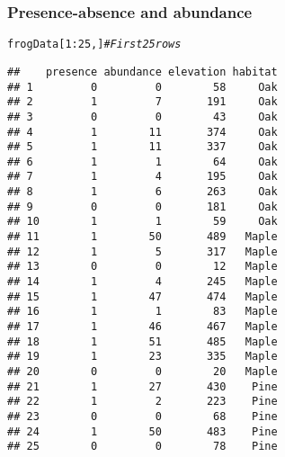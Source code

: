 \documentclass[color=usenames,dvipsnames]{beamer}\usepackage[]{graphicx}\usepackage[]{color}
\makeatletter
\newcommand{\hlnum}[1]{\textcolor[rgb]{0.69,0.494,0}{#1}}%
\newcommand{\hlcom}[1]{\textcolor[rgb]{0.514,0.506,0.514}{\textit{#1}}}%
\newcommand{\hlopt}[1]{\textcolor[rgb]{0,0,0}{#1}}%
\newcommand{\hlstd}[1]{\textcolor[rgb]{0,0,0}{#1}}%
\newenvironment{kframe}{%
 \def\at@end@of@kframe{}%
 \ifinner\ifhmode%
  \def\at@end@of@kframe{\end{minipage}}%
  \begin{minipage}{\columnwidth}%
 \fi\fi%
 \def\FrameCommand##1{\hskip\@totalleftmargin \hskip-\fboxsep
 \colorbox{shadecolor}{##1}\hskip-\fboxsep
     \hskip-\linewidth \hskip-\@totalleftmargin \hskip\columnwidth}%
 \MakeFramed {\advance\hsize-\width
   \@totalleftmargin\z@ \linewidth\hsize
   \@setminipage}}%
 {\par\unskip\endMakeFramed%
 \at@end@of@kframe}
\newenvironment{knitrout}{}{} %
\makeatother
\begin{document}
\begin{frame}[fragile]
  \frametitle{Presence-absence and abundance}

\begin{center}
\tiny
\begin{knitrout}\tiny
{}\color{fgcolor}\begin{kframe}
\begin{alltt}
\hlstd{frogData[}\hlnum{1}\hlopt{:}\hlnum{25}\hlstd{,]} \hlcom{# First 25 rows}
\end{alltt}
\begin{verbatim}
##    presence abundance elevation habitat
## 1         0         0        58     Oak
## 2         1         7       191     Oak
## 3         0         0        43     Oak
## 4         1        11       374     Oak
## 5         1        11       337     Oak
## 6         1         1        64     Oak
## 7         1         4       195     Oak
## 8         1         6       263     Oak
## 9         0         0       181     Oak
## 10        1         1        59     Oak
## 11        1        50       489   Maple
## 12        1         5       317   Maple
## 13        0         0        12   Maple
## 14        1         4       245   Maple
## 15        1        47       474   Maple
## 16        1         1        83   Maple
## 17        1        46       467   Maple
## 18        1        51       485   Maple
## 19        1        23       335   Maple
## 20        0         0        20   Maple
## 21        1        27       430    Pine
## 22        1         2       223    Pine
## 23        0         0        68    Pine
## 24        1        50       483    Pine
## 25        0         0        78    Pine
\end{verbatim}
\end{kframe}
\end{knitrout}
\end{center}
\end{frame}



\end{document}
